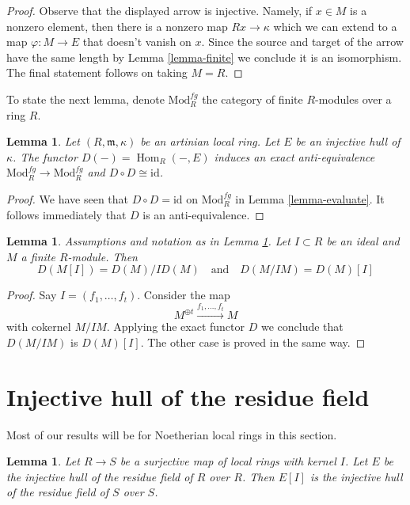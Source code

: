 \documentclass{stacks-project}
\theoremstyle{plain}
\newtheorem{lemma}[subsection]{Lemma}
\theoremstyle{definition}
\theoremstyle{remark}
\numberwithin{equation}{subsection}
\def\Hom{\mathop{\mathrm{Hom}}\nolimits}
\begin{document}
\begin{proof}
Observe that the displayed arrow is injective. Namely, if $x \in M$ is
a nonzero element, then there is a nonzero map $Rx \to \kappa$ which
we can extend to a map $\varphi : M \to E$ that doesn't vanish on $x$.
Since the source and target of the arrow have the same length by
Lemma \ref{lemma-finite}
we conclude it is an isomorphism. The final statement follows
on taking $M = R$.
\end{proof}

\noindent
To state the next lemma, denote $\text{Mod}^{fg}_R$ the category of finite
$R$-modules over a ring $R$.

\begin{lemma}
\label{lemma-duality}
Let $(R, \mathfrak m, \kappa)$ be an artinian local ring.
Let $E$ be an injective hull of $\kappa$.
The functor $D(-) = \Hom_R(-, E)$ induces an exact anti-equivalence
$\text{Mod}^{fg}_R \to \text{Mod}^{fg}_R$ and
$D \circ D \cong \text{id}$.
\end{lemma}

\begin{proof}
We have seen that $D \circ D = \text{id}$ on $\text{Mod}^{fg}_R$
in Lemma \ref{lemma-evaluate}. It follows immediately that
$D$ is an anti-equivalence.
\end{proof}

\begin{lemma}
\label{lemma-duality-torsion-cotorsion}
Assumptions and notation as in Lemma \ref{lemma-duality}.
Let $I \subset R$ be an ideal and $M$ a finite $R$-module.
Then
$$
D(M[I]) = D(M)/ID(M) \quad\text{and}\quad D(M/IM) = D(M)[I]
$$
\end{lemma}

\begin{proof}
Say $I = (f_1, \ldots, f_t)$. Consider the map
$$
M^{\oplus t} \xrightarrow{f_1, \ldots, f_t} M
$$
with cokernel $M/IM$. Applying the exact functor $D$ we conclude that
$D(M/IM)$ is $D(M)[I]$. The other case is proved in the same way.
\end{proof}



\section{Injective hull of the residue field}
\label{section-hull-residue-field}

\noindent
Most of our results will be for Noetherian local rings in this section.

\begin{lemma}
\label{lemma-quotient}
Let $R \to S$ be a surjective map of local rings with kernel $I$.
Let $E$ be the injective hull of the residue field of $R$ over $R$.
Then $E[I]$ is the injective hull of the residue field of $S$ over $S$.
\end{lemma}
\end{document}
